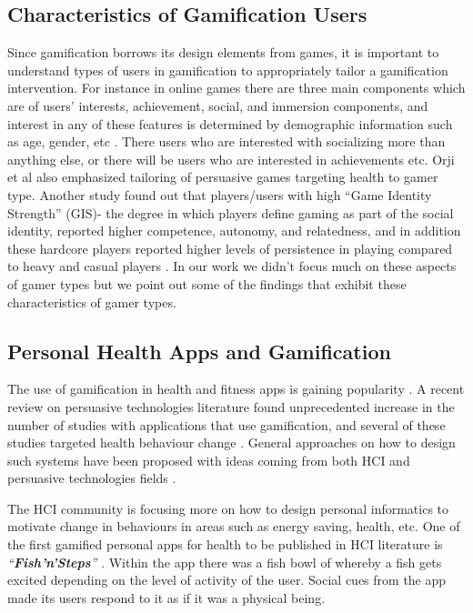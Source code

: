 \documentclass{sig-alternate}
\begin{document}
\subsection{Characteristics of Gamification Users}
Since gamification borrows its design elements from games, it is important to understand types of users in gamification to appropriately tailor a gamification intervention. For instance in online games there are three main components which are of users' interests, achievement, social, and immersion components, and interest in any of these features is determined by demographic information such as age, gender, etc \cite{yee2006:motivations}. There users who are interested with socializing more than anything else, or there will be users who are interested in achievements etc. Orji et al also \cite{orji2013:tailoring} emphasized tailoring of persuasive games targeting health to gamer type. Another study found out that players/users with high ``Game Identity Strength'' (GIS)- the degree in which players define gaming as part of the social identity, reported higher competence, autonomy, and relatedness, and in addition these hardcore players reported higher levels of persistence in playing compared to heavy and casual players \cite{neys2014:exploring}. In our work we didn't focus much on these aspects of gamer types but we point out some of the findings that exhibit these characteristics of gamer types. 
\subsection{Personal Health Apps and Gamification}  
The use of gamification in health and fitness apps is gaining popularity \cite{lister2014:just}. A recent review on persuasive technologies literature found unprecedented increase in the number of studies with applications that use gamification, and several of these studies targeted health behaviour change \cite{hamari2014persuasive}. General approaches on how to design such systems have been proposed with ideas coming from both HCI\cite{li2010:stage} and persuasive technologies fields \cite{fogg2009:behavior,Oinas-kukkonen:psd,Oinas-Kukkonen:foundation}.

The HCI community is focusing more on  how to design personal informatics to motivate change in behaviours in areas such as energy saving, health, etc. One of the first gamified personal apps for health to be published in HCI literature is \emph{``\textbf{Fish'n'Steps}''} \cite{lin2006:fish}. Within the app there  was a fish bowl of whereby a fish gets excited depending on the level of activity of the user. Social cues from the app made its users respond to it as if it was a physical being.
\end{document}
